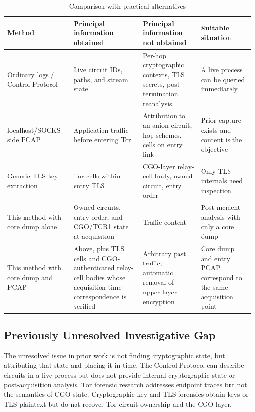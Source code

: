 \documentclass[10pt,a4paper]{article}
\newcommand{\torone}{\textsc{TOR1}}
\begin{document}
\begin{table}[!tbp]
\centering
\caption{Comparison with practical alternatives}
\label{tab:practical-alternatives}
\small
\begin{tabularx}{\linewidth}{L{28mm}Y Y L{25mm}}
\toprule
Method & Principal information obtained & Principal information not obtained & Suitable situation \\
\midrule
Ordinary logs / Control Protocol & Live circuit IDs, paths, and stream state & Per-hop cryptographic contexts, TLS secrets, post-termination reanalysis & A live process can be queried immediately \\
localhost/SOCKS-side PCAP~\cite{dfrws2026localtor} & Application traffic before entering Tor & Attribution to an onion circuit, hop schemes, cells on entry link & Prior capture exists and content is the objective \\
Generic TLS-key extraction~\cite{moriconi2024xraytls,baier2024tlsmemory} & Tor cells within entry TLS & CGO-layer relay-cell body, owned circuit, entry order & Only TLS internals need inspection \\
This method with core dump alone & Owned circuits, entry order, and CGO/\torone{} state at acquisition & Traffic content & Post-incident analysis with only a core dump \\
This method with core dump and PCAP & Above, plus TLS cells and CGO-authenticated relay-cell bodies whose acquisition-time correspondence is verified & Arbitrary past traffic; automatic removal of upper-layer encryption & Core dump and entry PCAP correspond to the same acquisition point \\
\bottomrule
\end{tabularx}
\end{table}

\subsection{Previously Unresolved Investigative Gap}

The unresolved issue in prior work is not finding cryptographic state, but attributing that state and placing it in time.
The Control Protocol can describe circuits in a live process but does not provide internal cryptographic state or post-acquisition analysis.
Tor forensic research addresses endpoint traces but not the semantics of CGO state.
Cryptographic-key and TLS forensics obtain keys or TLS plaintext but do not recover Tor circuit ownership and the CGO layer.
\end{document}
